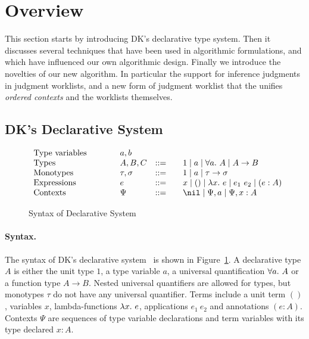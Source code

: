 \section{Overview}

This section starts by introducing DK's declarative type system. Then
it discusses several techniques that have been used in algorithmic
formulations, and which have influenced our own algorithmic design.
Finally we introduce the novelties of our new algorithm.
In particular the support for inference judgments in
judgment worklists, and a new form of judgment worklist
that the unifies \emph{ordered contexts} and the worklists themselves. 

\subsection{DK's Declarative System}

\begin{figure}[t]
\[
\begin{array}{l@{\qquad}lcl}
\text{Type variables}\qquad&a, b
\\
\text{Types}\qquad&A, B, C &::=&\quad 1 \mid a \mid \all A \mid A\to B\\
\text{Monotypes}\qquad&\tau,\sigma &::=&\quad 1 \mid a \mid \tau\to \sigma
\\
\text{Expressions}\qquad&e &::=&\quad x \mid () \mid \lam e \mid e_1~e_2 \mid (e:A)
\\
\text{Contexts}\qquad&\Psi &::=&\quad \nil \mid \Psi, a \mid \Psi, x:A
\end{array}
\]
\caption{Syntax of Declarative System}\label{fig:decl:syntax}
\end{figure}

\paragraph{Syntax.}
The syntax of DK's declarative system~\cite{dunfield2013complete} is shown in Figure~\ref{fig:decl:syntax}.
A declarative type $A$ is either the unit type $1$, a type variable $a$,
a universal quantification $\all A$ or a function type $A \to B$.
Nested universal quantifiers are allowed for types,
but monotypes $\tau$ do not have any universal quantifier.
Terms include a unit term $()$, variables $x$, lambda-functions $\lam e$,
applications $e_1~e_2$ and annotations $(e:A)$.
Contexts $\Psi$ are sequences of type variable declarations and
term variables with its type declared $x:A$.

